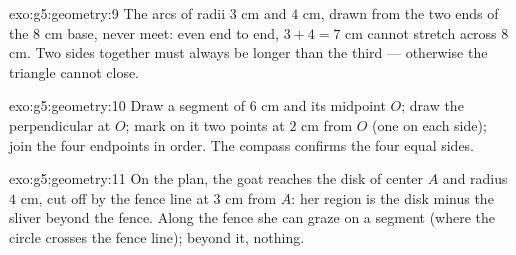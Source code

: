 \begin{solution}{exo:g5:geometry:9}
The arcs of radii $3$ cm and $4$ cm, drawn from the two ends of the
$8$ cm base, never meet: even end to end, $3 + 4 = 7$ cm cannot
stretch across $8$ cm. Two sides together must always be longer than
the third --- otherwise the triangle cannot close.
\end{solution}

\begin{solution}{exo:g5:geometry:10}
Draw a segment of $6$ cm and its midpoint $O$; draw the
perpendicular at $O$; mark on it two points at $2$ cm from $O$ (one
on each side); join the four endpoints in order. The compass
confirms the four equal sides.
\end{solution}

\begin{solution}{exo:g5:geometry:11}
On the plan, the goat reaches the disk of center $A$ and radius
$4$ cm, cut off by the fence line at $3$ cm from $A$: her region is
the disk minus the sliver beyond the fence. Along the fence she can
graze on a segment (where the circle crosses the fence line);
beyond it, nothing.
\end{solution}
